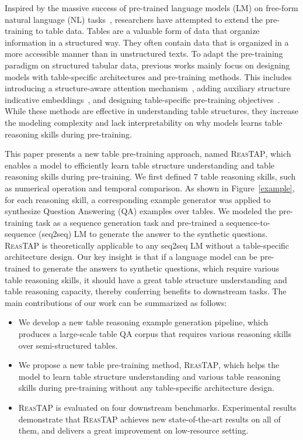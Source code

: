 \documentclass[11pt]{article}
\newcommand{\ours}{\textsc{ReasTAP}\xspace}
\newcommand{\nreason}{7\xspace}
\begin{document}
Inspired by the massive success of pre-trained language models (LM) on free-form natural language (NL) tasks~\cite{devlin-etal-2019-bert, unilm, 2020t5, lewis-etal-2020-bart}, researchers have attempted to extend the pre-training to table data. Tables are a valuable form of data that organize information in a structured way. They often contain data that is organized in a more accessible manner than in unstructured texts. To adapt the pre-training paradigm on structured tabular data, previous works mainly focus on designing models with table-specific architectures and pre-training methods. This includes introducing a structure-aware attention mechanism~\cite{yin2020tabert, turl, zayats-etal-2021-representations}, adding auxiliary structure indicative embeddings~\cite{tapas1, tapas2, tuta}, and designing table-specific pre-training objectives~\cite{yin2020tabert, yu2021grappa,tuta, liu2022tapex, liu2022plog}.
While these methods are effective in understanding table structures, they increase the modeling complexity and lack interpretability on why models learns table reasoning skills during pre-training.


This paper presents a new table pre-training approach, named \ours, which enables a model to efficiently learn table structure understanding and table reasoning skills during pre-training. 
We first defined \nreason table reasoning skills, such as numerical operation and temporal comparison. As shown in Figure~\ref{example}, for each reasoning skill, a corresponding example generator was applied to synthesize Question Answering (QA) examples over tables.
We modeled the pre-training task as a sequence generation task and pre-trained a sequence-to-sequence (seq2seq) LM to generate the answer to the synthetic questions. \ours is theoretically applicable to any seq2seq LM without a table-specific architecture design. Our key insight is that if a language model can be pre-trained to generate the answers to synthetic questions, which require various table reasoning skills, it should have a great table structure understanding and table reasoning capacity, thereby conferring benefits to downstream tasks. 
The main contributions of our work can be summarized as follows: 
\begin{itemize}
    \item We develop a new table reasoning example generation pipeline, which produces a large-scale table QA corpus that requires various reasoning skills over semi-structured tables.
    \item We propose a new table pre-training method, \ours, which helps the model to learn table structure understanding and various table reasoning skills during pre-training without any table-specific architecture design.
    \item \ours is evaluated on four downstream benchmarks. Experimental results demonstrate that \ours achieves new state-of-the-art results on all of them, and delivers a great improvement on low-resource setting. 
\end{itemize}
     
\end{document}
